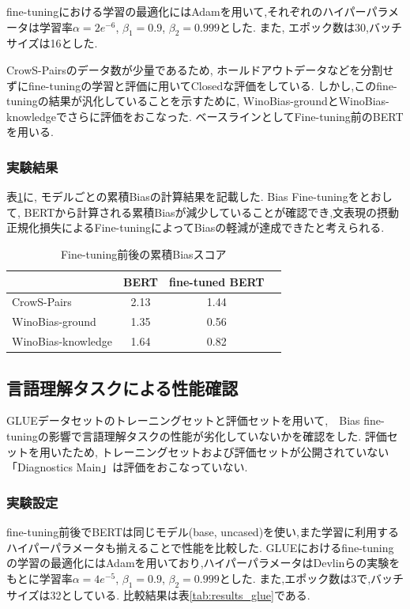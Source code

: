 \documentclass[
  platex, dvipdfmx %
]{nlp2021}
\begin{document}
fine-tuningにおける学習の最適化にはAdamを用いて,それぞれのハイパーパラメータは学習率$\alpha = 2e^{-6}$, $\beta_1 = 0.9$, $\beta_2 = 0.999$とした.
また, エポック数は30,バッチサイズは16とした.

CrowS-Pairsのデータ数が少量であるため, ホールドアウトデータなどを分割せずにfine-tuningの学習と評価に用いてClosedな評価をしている.
しかし,このfine-tuningの結果が汎化していることを示すために, WinoBias-groundとWinoBias-knowledgeでさらに評価をおこなった.
ベースラインとしてFine-tuning前のBERTを用いる.

\subsubsection{実験結果}
表\ref{tab:results_bias}に, モデルごとの累積Biasの計算結果を記載した.
Bias Fine-tuningをとおして, BERTから計算される累積Biasが減少していることが確認でき,文表現の摂動正規化損失によるFine-tuningによってBiasの軽減が達成できたと考えられる.

\begin{table}[h]
\centering
\caption{Fine-tuning前後の累積Biasスコア}
\label{tab:results_bias}
\begin{tabular}{lccc}
\hline
 &  BERT & fine-tuned BERT \\
\hline
CrowS-Pairs & 2.13 &  1.44 \\
WinoBias-ground & 1.35 &  0.56  \\
WinoBias-knowledge & 1.64 & 0.82 \\
\hline
\end{tabular}
\end{table}

\subsection{言語理解タスクによる性能確認}
GLUEデータセットのトレーニングセットと評価セットを用いて,　Bias fine-tuningの影響で言語理解タスクの性能が劣化していないかを確認をした.
評価セットを用いたため, トレーニングセットおよび評価セットが公開されていない「Diagnostics Main」は評価をおこなっていない.
\subsubsection{実験設定}
fine-tuning前後でBERTは同じモデル(base, uncased)を使い,また学習に利用するハイパーパラメータも揃えることで性能を比較した.
GLUEにおけるfine-tuningの学習の最適化にはAdamを用いており,ハイパーパラメータはDevlinら\cite{devlin2018bert}の実験をもとに学習率$\alpha = 4e^{-5}$, $\beta_1 = 0.9$, $\beta_2 = 0.999$とした.
また,エポック数は3で,バッチサイズは32としている.
比較結果は表\ref{tab:results_glue}である.
\end{document}

